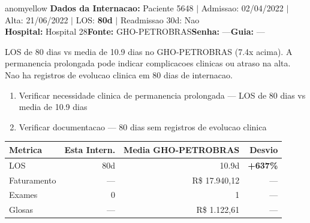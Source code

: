 \documentclass[a4paper,10pt]{article}
\begin{document}
\begin{anomalycard}[Internacao 5402 | GHO-PETROBRAS | MODERADO (z=2.29)]{anomyellow}
\textbf{Dados da Internacao:} Paciente 5648 $\mid$ Admissao: 02/04/2022 $\mid$ Alta: 21/06/2022 $\mid$ LOS: \textbf{80d} $\mid$ Readmissao 30d: Nao\\
\textbf{Hospital:} Hospital 28\quad\textbf{Fonte:} GHO-PETROBRAS\quad\textbf{Senha:} ---\quad\textbf{Guia:} ---\\
\vspace{2pt}\begin{tcolorbox}[colback=severityred!20,colframe=anomyellow,title={\textbf{Interpretacao de Negocio}},fonttitle=\bfseries\small,left=4pt,right=4pt,top=3pt,bottom=3pt]
{\small LOS de 80 dias vs media de 10.9 dias no GHO-PETROBRAS (7.4x acima). A permanencia prolongada pode indicar complicacoes clinicas ou atraso na alta. Nao ha registros de evolucao clinica em 80 dias de internacao.}
\end{tcolorbox}
\begin{tcolorbox}[colback=severityyellow!30,colframe=anomorange,title={\textbf{Recomendacoes Especificas}},fonttitle=\bfseries\small,left=4pt,right=4pt,top=3pt,bottom=3pt]
\begin{enumerate}[nosep,leftmargin=16pt]
\item {\small Verificar necessidade clinica de permanencia prolongada --- LOS de 80 dias vs media de 10.9 dias}
\item {\small Verificar documentacao --- 80 dias sem registros de evolucao clinica}
\end{enumerate}
\end{tcolorbox}
\begin{center}\begin{tabular}{l r r r}\toprule\textbf{Metrica} & \textbf{Esta Intern.} & \textbf{Media GHO-PETROBRAS} & \textbf{Desvio} \\\midrule
LOS & 80d & 10.9d & \textcolor{anomred}{\textbf{+637\%}} \\
Faturamento & --- & R\$ 17.940,12 & --- \\
Exames & 0 & 1 & --- \\
Glosas & --- & R\$ 1.122,61 & --- \\
\bottomrule\end{tabular}\end{center}


\end{anomalycard}
\end{document}
